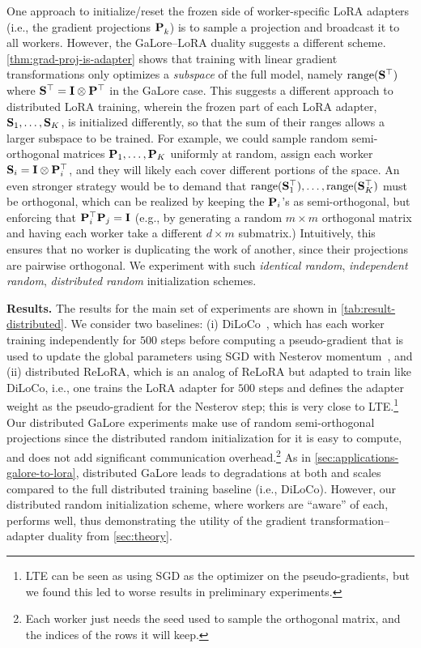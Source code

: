 One approach to initialize/reset the frozen side of worker-specific LoRA adapters (i.e., the gradient projections ${\mathbf{P}}_{k}^{}$) is to sample a projection and broadcast it to all workers. However, the GaLore--LoRA duality suggests a different scheme. \cref{thm:grad-proj-is-adapter} shows that training with linear gradient transformations only optimizes a \emph{subspace} of the full model, namely $\operatorname{range} ({\mathbf{S}}^\top)$ where ${\mathbf{S}}^\top = {\mathbf{I}} \otimes {\mathbf{P}}^\top$ in the GaLore case. This suggests a different approach to distributed LoRA training, wherein the frozen part of each LoRA adapter, ${\mathbf{S}}_1, \ldots, {\mathbf{S}}_K$, is initialized differently, so that the sum of their ranges allows a larger subspace to be trained. 
For example, we could sample random semi-orthogonal matrices ${\mathbf{P}}_1, \ldots, {\mathbf{P}}_K$ uniformly at random, assign each worker ${\mathbf{S}}_i = {\mathbf{I}} \otimes {\mathbf{P}}^\top_i$, and they will likely each cover different portions of the space.
An even stronger strategy would be to demand that $\operatorname{range} ({\mathbf{S}}^\top_1), \ldots, \operatorname{range} ({\mathbf{S}}^\top_K)$ must be orthogonal, which can be realized by keeping the ${\mathbf{P}}_i$'s as semi-orthogonal, but enforcing that ${\mathbf{P}}_i^\top {\mathbf{P}}_j = {\mathbf{I}}$ (e.g., by generating a random $m \times m$ orthogonal matrix and having each worker take a different $d \times m$ submatrix.)
Intuitively, this ensures that no worker is duplicating the work of another, since their projections are pairwise orthogonal. We experiment with such \emph{identical random}, \emph{independent random}, \emph{distributed random} initialization schemes.







\noindent\textbf{Results.}
The results for the main set of experiments are shown in \cref{tab:result-distributed}. 
 We consider two baselines: (i) DiLoCo~\citep{diloco}, which has each worker training independently for $500$ steps before computing a pseudo-gradient that is used to update the global parameters using SGD with Nesterov momentum~\citep{nesterov}, and (ii) distributed ReLoRA, which is an analog of ReLoRA but adapted to train like DiLoCo, i.e., one trains the LoRA adapter for $500$ steps and defines the adapter weight as the pseudo-gradient for the Nesterov step; this is very close to LTE.\footnote{LTE can be seen as using SGD as the optimizer on the pseudo-gradients, but we found this led to worse results in preliminary experiments.} Our distributed GaLore experiments make use of random semi-orthogonal projections since the distributed random initialization for it is easy to compute, and does not add significant communication overhead.\footnote{Each worker just needs the seed used to sample the orthogonal matrix, and the indices of the rows  it will keep.}
As in \cref{sec:applications-galore-to-lora},  distributed GaLore leads to degradations at both \tinyB and \largeB scales compared to the full distributed training baseline (i.e., DiLoCo). However, our distributed random initialization scheme, where workers are ``aware'' of each, performs  well, thus demonstrating the utility of the gradient transformation--adapter duality from \cref{sec:theory}.




